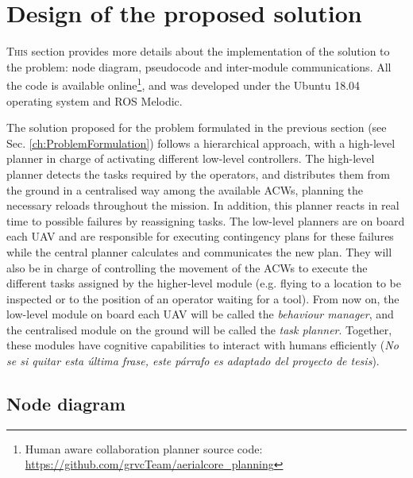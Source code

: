 \chapter{Design of the proposed solution}
\label{ch:DesignOfTheProposedSolution}
\lettrine[lraise=-0.1, lines=2, loversize=0.2]{T}{his} section provides more details about the implementation of the solution to the problem: node diagram, pseudocode and inter-module communications. All the code is available online\footnote{Human aware collaboration planner source code: \url{https://github.com/grvcTeam/aerialcore_planning}}, and was developed under the Ubuntu 18.04 operating system and ROS Melodic.

The solution proposed for the problem formulated in the previous section (see Sec. \ref{ch:ProblemFormulation}) follows a hierarchical approach, with a high-level planner in charge of activating different low-level controllers. The high-level planner detects the tasks required by the operators, and distributes them from the ground in a centralised way among the available \glspl{ACW}, planning the necessary reloads throughout the mission. In addition, this planner reacts in real time to possible failures by reassigning tasks. The low-level planners are on board each \gls{UAV} and are responsible for executing contingency plans for these failures while the central planner calculates and communicates the new plan. They will also be in charge of controlling the movement of the \glspl{ACW} to execute the different tasks assigned by the higher-level module (e.g. flying to a location to be inspected or to the position of an operator waiting for a tool). From now on, the low-level module on board each \gls{UAV} will be called the \emph{behaviour manager}, and the centralised module on the ground will be called the \emph{task planner}. Together, these modules have cognitive capabilities to interact with humans efficiently (\emph{No se si quitar esta última frase, este párrafo es adaptado del proyecto de tesis}).


\section{Node diagram}
\label{sec:NodeDiagram}

